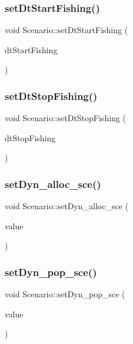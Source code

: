 \subsubsection{\texorpdfstring{setDtStartFishing()}{setDtStartFishing()}}
{\footnotesize\ttfamily void Scenario\+::set\+Dt\+Start\+Fishing (\begin{DoxyParamCaption}\item[{const Q\+String \&}]{dt\+Start\+Fishing }\end{DoxyParamCaption})}

\mbox{\label{class_scenario_aa57c07db0cb9bb8a9786c65b004b710e}} 
\subsubsection{\texorpdfstring{setDtStopFishing()}{setDtStopFishing()}}
{\footnotesize\ttfamily void Scenario\+::set\+Dt\+Stop\+Fishing (\begin{DoxyParamCaption}\item[{const Q\+String \&}]{dt\+Stop\+Fishing }\end{DoxyParamCaption})}

\mbox{\label{class_scenario_ad3fdb2128204158acb86f67137fffabb}} 
\subsubsection{\texorpdfstring{setDyn\_alloc\_sce()}{setDyn\_alloc\_sce()}}
{\footnotesize\ttfamily void Scenario\+::set\+Dyn\+\_\+alloc\+\_\+sce (\begin{DoxyParamCaption}\item[{const Q\+String\+List \&}]{value }\end{DoxyParamCaption})}

\mbox{\label{class_scenario_ac7e6718d5d4657af2bd7e14f14b6d40f}} 
\subsubsection{\texorpdfstring{setDyn\_pop\_sce()}{setDyn\_pop\_sce()}}
{\footnotesize\ttfamily void Scenario\+::set\+Dyn\+\_\+pop\+\_\+sce (\begin{DoxyParamCaption}\item[{const Q\+String\+List \&}]{value }\end{DoxyParamCaption})}

